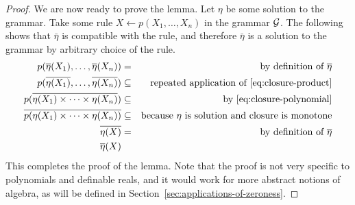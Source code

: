 \begin{proof}
We are now ready to prove the lemma. Let $\eta$ be some solution to the grammar.  Take some rule $X \leftarrow p(X_1,\ldots,X_n)$ in the grammar $\Gg$. The following shows that $\bar \eta$ is compatible with the rule, and therefore $\bar \eta$ is a solution to the grammar by arbitrary choice of the rule.
\begin{eqnarray*}
  p(\bar \eta (X_1),\ldots, \bar \eta (X_n)) &=& \text{by definition of $\bar \eta$} \\
    p(\bar{ \eta (X_1)},\ldots, \bar {\eta (X_n)}) &\subseteq & \text{repeated application of~\eqref{eq:closure-product}}  \\
  p(\bar{ \eta (X_1) \times \cdots \times  \eta (X_n)}) &\subseteq & \text{by~\eqref{eq:closure-polynomial}}  \\
  \bar{  p( \eta (X_1) \times \cdots \times  \eta (X_n))} &\subseteq & \text{because $\eta$ is solution and closure is monotone}  \\
    \bar{  \eta(X)} &=& \text{by definition of $\bar \eta$}\\
    \bar \eta (X)
\end{eqnarray*}
This completes the proof of the lemma. Note that the proof is not very specific to polynomials and definable reals, and it would work for more abstract notions of algebra, as will be  defined in Section~\ref{sec:applications-of-zeroness}.
\end{proof}

